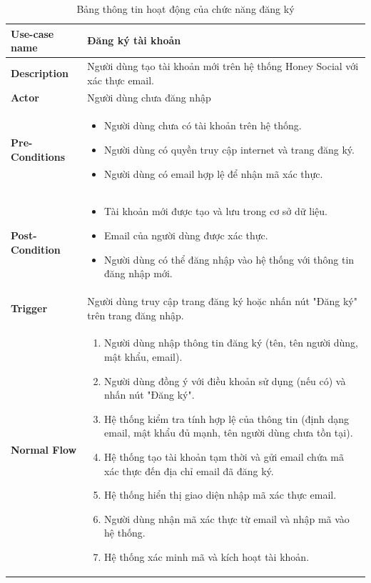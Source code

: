 \begin{longtable}{|>{\bfseries}m{4cm}|m{10cm}|}
    \caption{Bảng thông tin hoạt động của chức năng đăng ký}
    \label{table:usecase-register}\\
\hline
Use-case name & Đăng ký tài khoản \\
\hline
Description & Người dùng tạo tài khoản mới trên hệ thống Honey Social với xác thực email. \\
\hline
Actor & Người dùng chưa đăng nhập \\
\hline
Pre-Conditions & 
\begin{itemize}
    \item Người dùng chưa có tài khoản trên hệ thống.
    \item Người dùng có quyền truy cập internet và trang đăng ký.
    \item Người dùng có email hợp lệ để nhận mã xác thực.
\end{itemize} \\
\hline
Post-Condition & 
\begin{itemize}
    \item Tài khoản mới được tạo và lưu trong cơ sở dữ liệu.
    \item Email của người dùng được xác thực.
    \item Người dùng có thể đăng nhập vào hệ thống với thông tin đăng nhập mới.
\end{itemize} \\
\hline
Trigger & Người dùng truy cập trang đăng ký hoặc nhấn nút "Đăng ký" trên trang đăng nhập. \\
\hline
Normal Flow &
\begin{enumerate}
    \item Người dùng nhập thông tin đăng ký (tên, tên người dùng, mật khẩu, email).
    \item Người dùng đồng ý với điều khoản sử dụng (nếu có) và nhấn nút "Đăng ký".
    \item Hệ thống kiểm tra tính hợp lệ của thông tin (định dạng email, mật khẩu đủ mạnh, tên người dùng chưa tồn tại).
    \item Hệ thống tạo tài khoản tạm thời và gửi email chứa mã xác thực đến địa chỉ email đã đăng ký.
    \item Hệ thống hiển thị giao diện nhập mã xác thực email.
    \item Người dùng nhận mã xác thực từ email và nhập mã vào hệ thống.
    \item Hệ thống xác minh mã và kích hoạt tài khoản.

\end{enumerate}
\end{longtable}
